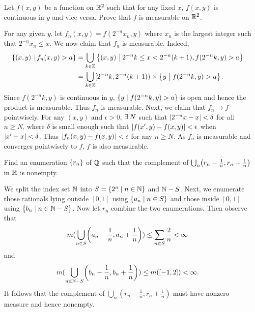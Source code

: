 \begin{exercise}
    Let $f(x,y)$ be a function on $\mathbb{R}^2$ such that for any 
    fixed $x$, $f(x,y)$ is continuous in $y$ and vice versa. 
    Prove that $f$ is measurable on $\mathbb{R}^2$. 
\end{exercise}
\begin{pf}
    For any given $y$, let $f_n(x,y) = f(2^{-n}x_n,y)$ where 
    $x_n$ is the largest integer such that $2^{-n}x_n\leq x$. 
    We now claim that $f_n$ is measurable. Indeed, 
    \begin{equation*}
        \begin{split}
            \left\{ (x,y) \;\middle\vert\; f_n(x,y)>a \right\} &= \bigcup_{k\in\mathbb{Z}} 
            \left\{ (x,y) \;\middle\vert\; 2^{-n}k\leq x < 2^{-n}(k+1),f(2^{-n}k,y)>a \right\}\\
            &= \bigcup_{k\in\mathbb{Z}} [2^{-n}k,2^{-n}(k+1))\times\left\{ y \;\middle\vert\; f(2^{-n}k,y)>a \right\}.
        \end{split}
    \end{equation*}
    Since $f(2^{-n}k,y)$ is continuous in $y$, $\left\{ y \;\middle\vert\; f(2^{-n}k,y)>a \right\}$ 
    is open and hence the product is measurable. Thus $f_n$ is 
    measurable. Next, we claim that $f_n\to f$ pointwisely. 
    For any $(x,y)$ and $\epsilon>0$, $\exists\: N$ such that 
    $\left\lvert {2^{-n}x-x} \right\rvert<\delta$ for all $n\geq N$, where $\delta$ 
    is small enough such that $\left\lvert {f(x',y)-f(x,y)} \right\rvert<\epsilon$ 
    when $\left\lvert {x'-x} \right\rvert<\delta$. Thus 
    $\left\lvert {f_n(x,y)-f(x,y)} \right\rvert<\epsilon$ for any $n\geq N$. As 
    $f_n$ is measurable and converges pointwisely to $f$, $f$ 
    is also measurable.
\end{pf}

\begin{exercise}
    Find an enumeration $\left\{ {r_n} \right\}$ of $\mathbb{Q}$ such that the 
    complement of $\bigcup_n \pth{r_n-\frac{1}{n}, r_n+\frac{1}{n}}$ 
    in $\mathbb{R}$ is nonempty.
\end{exercise}
\begin{pf}
    We split the index set $\mathbb{N}$ into $S = \left\{ 2^n \;\middle\vert\; n\in\mathbb{N} \right\}$ 
    and $\mathbb{N}-S$. Next, we enumerate those rationals lying 
    outside $[0,1]$ using $\left\{ a_n \;\middle\vert\; n\in S \right\}$ and those inside 
    $[0,1]$ using $\left\{ b_n \;\middle\vert\; n\in\mathbb{N}-S \right\}$. Now let $r_n$ combine 
    the two enumerations. Then observe that 
    \[
        m(\bigcup_{n\in S} \pth{a_n-\frac{1}{n}, a_n+\frac{1}{n}})
        \leq \sum_{n\in S} \frac{2}{n} < \infty
    \] 
    and 
    \[
        m(\bigcup_{n\in\N-S} \pth{b_n-\frac{1}{n}, b_n+\frac{1}{n}})
        \leq m([-1,2]) < \infty.
    \]
    It follows that the complement of $\bigcup_n 
    (r_n-\frac{1}{n},r_n+\frac{1}{n})$ must have nonzero measure 
    and hence nonempty. 
\end{pf}


